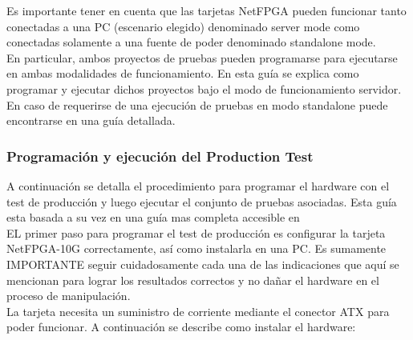 Es importante tener en cuenta que las tarjetas NetFPGA pueden funcionar tanto conectadas a una PC (escenario elegido) denominado server mode como conectadas solamente a una fuente de poder denominado standalone mode.\\

En particular, ambos proyectos de pruebas pueden programarse para ejecutarse en ambas modalidades de funcionamiento. En esta guía se explica como programar y ejecutar dichos proyectos bajo el modo de funcionamiento servidor. En caso de requerirse de una ejecuci\'on de pruebas en modo standalone puede encontrarse en\citep{NetFPGA6}\citep{NetFPGA8} una guía detallada.

\subsubsection{Programación y ejecución del Production Test}
A continuación se detalla el procedimiento para programar el hardware con el test de producción y luego ejecutar el conjunto de pruebas asociadas. Esta guía esta basada a su vez en una guía mas completa accesible en\citep{NetFPGA6}\\

EL primer paso para programar el test de producción es configurar la tarjeta NetFPGA-10G correctamente, así como instalarla en una PC. Es sumamente IMPORTANTE seguir cuidadosamente cada una de las indicaciones que aquí se mencionan para lograr los resultados correctos y no dañar el hardware en el proceso de manipulación.\\ 

La tarjeta necesita un suministro de corriente mediante el conector ATX para poder funcionar. A continuación se describe como instalar el hardware:

